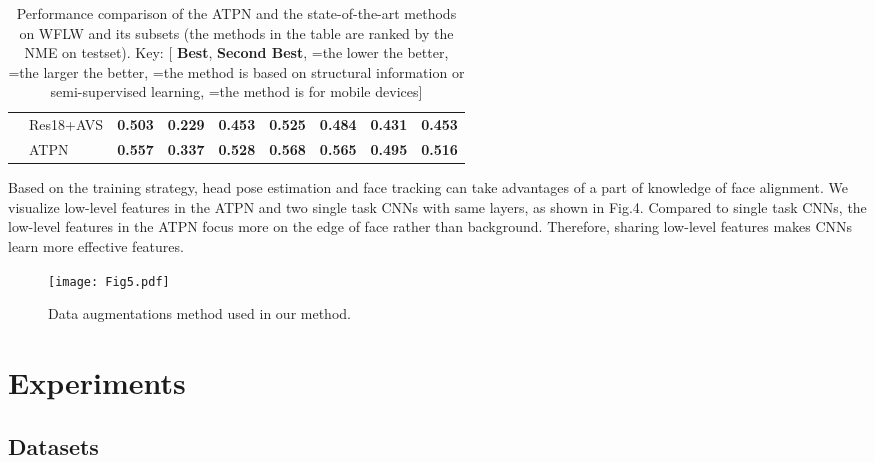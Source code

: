 \documentclass[3p,twocolumn, round, sort & compress]{elsarticle}
\begin{document}
\begin{table*}[t!]
\begin{tabular}{m{1.4cm}<{\centering}|m{3.8cm}<{\centering}|m{0.8cm}<{\centering}|m{0.7cm}<{\centering}|m{1.4cm}<{\centering}|m{1.5cm}<{\centering}|m{1.3cm}<{\centering}|m{1.2cm}<{\centering}|m{0.7cm}<{\centering}}
		& Res18+AVS & {\color{blue} \textbf{0.503}}   & {\color{blue} \textbf{0.229}} & {\color{blue} \textbf{0.453}}      & {\color{blue} \textbf{0.525}} & {\color{blue} \textbf{0.484}} & {\color{blue} \textbf{0.431}}     & {\color{blue} \textbf{0.453}} \\
		& ATPN & {\color{red} \textbf{0.557}} & {\color{red} \textbf{0.337}} & {\color{red} \textbf{0.528}} & {\color{red} \textbf{0.568}} & {\color{red} \textbf{0.565}} & {\color{red} \textbf{0.495}} & {\color{red} \textbf{0.516}} \\ \hline
	\end{tabular}
	\caption{Performance comparison of the ATPN and the state-of-the-art methods on WFLW and its subsets (the methods in the table are ranked by the NME on testset). Key: [{\color{red} \textbf{Best}}, {\color{blue} \textbf{Second Best}}, =the lower the better, =the larger the better, =the method is based on structural information or semi-supervised learning, =the method is for mobile devices]}
	\label{Tabal1}
\end{table*}
Based on the training strategy, head pose estimation and face tracking can take advantages of a part of knowledge of face alignment. We visualize low-level features in the ATPN and two single task CNNs with same layers, as shown in Fig.4. Compared to single task CNNs, the low-level features in the ATPN focus more on the edge of face rather than background. Therefore, sharing low-level features makes CNNs learn more effective features.

\begin{figure}[t!]
	\centering
	\texttt{[image: Fig5.pdf]}
	\caption{Data augmentations method used in our method.}
	\label{fig5}
\end{figure}

\section{Experiments}

\subsection{Datasets} \label{sec:datasets}
\end{document}
